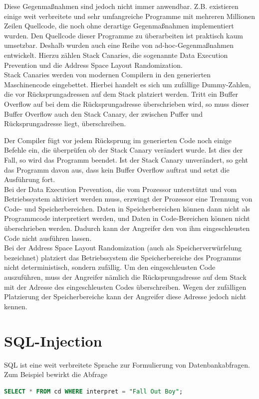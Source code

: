 Diese Gegenmaßnahmen sind jedoch nicht immer anwendbar.
Z.B. existieren einige weit verbreitete und sehr umfangreiche Programme mit mehreren Millionen Zeilen Quellcode, die noch ohne derartige Gegenmaßnahmen implementiert wurden.
Den Quellcode dieser Programme zu überarbeiten ist praktisch kaum umsetzbar.
Deshalb wurden auch eine Reihe von ad-hoc-Gegenmaßnahmen entwickelt.
Hierzu zählen Stack Canaries, die sogenannte Data
Execution Prevention und die Address
Space Layout Randomization.\\

Stack Canaries werden von modernen Compilern in den generierten Maschinencode eingebettet.
Hierbei handelt es sich um zufällige Dummy-Zahlen, die vor Rücksprungadressen auf dem Stack platziert werden.
Tritt ein Buffer Overflow auf bei dem die Rücksprungadresse überschrieben wird, so muss dieser Buffer Overflow auch den Stack Canary, der zwischen Puffer und Rücksprungadresse liegt, überschreiben.

Der Compiler fügt vor jedem Rücksprung im generierten Code noch einige Befehle ein, die überprüfen ob der Stack Canary verändert wurde.
Ist dies der Fall, so wird das Programm beendet.
Ist der Stack Canary unverändert, so geht das Programm davon aus, dass kein Buffer Overflow auftrat und setzt die Ausführung fort.\\

Bei der Data Execution Prevention, die vom Prozessor unterstützt und vom Betriebssystem aktiviert werden muss,
erzwingt der Prozessor eine Trennung von Code- und Speicherbereichen.
Daten in Speicherbereichen können dann nicht als Programmcode interpretiert werden, und Daten in Code-Bereichen können nicht überschrieben werden.
Dadurch kann der Angreifer den von ihm eingeschleusten Code nicht ausführen lassen.\\

Bei der Address Space Layout Randomization (auch als Speicherverwürfelung bezeichnet) platziert das Betriebssystem die Speicherbereiche des Programms nicht deterministisch, sondern zufällig.
Um den eingeschleusten Code auszuführen, muss der Angreifer nämlich die Rücksprungadresse auf dem Stack mit der Adresse des eingeschleusten Codes überschreiben.
Wegen der zufälligen Platzierung der Speicherbereiche kann der Angreifer diese Adresse jedoch nicht kennen.


\section{SQL-Injection}
SQL ist eine weit verbreitete Sprache zur Formulierung von Datenbankabfragen. Zum Beispiel bewirkt die Abfrage
\begin{lstlisting}[language=SQL]
  SELECT * FROM cd WHERE interpret = "Fall Out Boy";
\end{lstlisting}

